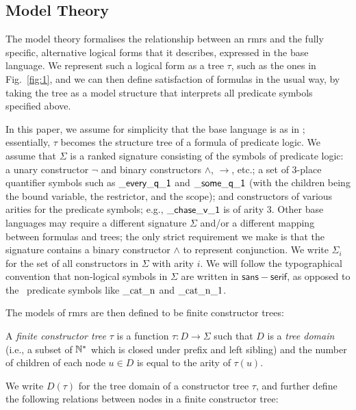 \subsection{Model Theory} \label{sec:model-theory}

The model theory formalises the relationship between an {\sc rmrs} and
the fully specific, alternative logical forms that it describes,
expressed in the base language.  We represent such a logical form as a
tree $\tau$, such as the ones in Fig.~\ref{fig:1}, and we can then
define satisfaction of formulas in the usual way, by taking the tree
as a model structure that interprets all predicate symbols specified
above.

In this paper, we assume for simplicity that the base language is as
in \mrs; essentially, $\tau$ becomes the structure tree of a formula
of predicate logic.  We assume that $\Sigma$ is a ranked signature
consisting of the symbols of predicate logic: a unary constructor
$\neg$ and binary constructors $\wedge$, $\rightarrow$, etc.; a set of
3-place quantifier symbols such as $\mathsf{\_every\_q\_1}$ and
$\mathsf{\_some\_q\_1}$ (with the children being the bound variable, the
restrictor, and the scope); and constructors of various arities for
the predicate symbols; e.g., $\mathsf{\_chase\_v\_1}$ is of arity 3.  Other
base languages may require a different signature $\Sigma$ and/or a
different mapping between formulas and trees; the only strict
requirement we make is that the signature contains a binary
constructor $\wedge$ to represent conjunction.  We write $\Sigma_i$
for the set of all constructors in $\Sigma$ with arity $i$.  We
will follow the typographical convention that non-logical symbols in
$\Sigma$ are written in $\mathsf{sans{-}serif}$, as opposed to the
\rmrs\ predicate symbols like $\mathrm{\_cat\_n}$ and
$\mathrm{\_cat\_n\_1}$.

The models of {\sc rmrs} are then defined to be finite constructor
trees:
\begin{definition}\label{defn:models}
  A {\em finite constructor tree} $\tau$ is a function $\tau:D
  \rightarrow \Sigma$ such that $D$ is a \emph{tree domain} (i.e., a
  subset of $\mathbb{N}^*$ which is closed under prefix and left sibling) and
  the number of children of each node $u \in D$ is equal to the arity
  of $\tau(u)$.  
\end{definition}

We write $D(\tau)$ for the tree domain of a constructor tree $\tau$,
and further define the following relations between nodes in a finite
constructor tree:

